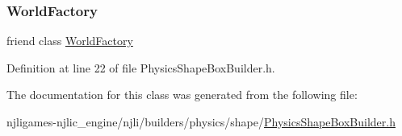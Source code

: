 \subsubsection{\texorpdfstring{World\+Factory}{WorldFactory}}
{\footnotesize\ttfamily friend class \mbox{\hyperlink{classnjli_1_1_world_factory}{World\+Factory}}\hspace{0.3cm}{\ttfamily [friend]}}



Definition at line 22 of file Physics\+Shape\+Box\+Builder.\+h.



The documentation for this class was generated from the following file\+:\begin{DoxyCompactItemize}
\item 
njligames-\/njlic\+\_\+engine/njli/builders/physics/shape/\mbox{\hyperlink{_physics_shape_box_builder_8h}{Physics\+Shape\+Box\+Builder.\+h}}\end{DoxyCompactItemize}
